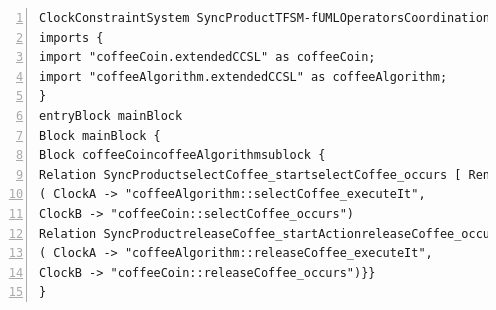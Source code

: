 \begin{lstlisting}[language=moccml,
caption={Resulting \ccsl specification for the running example},
label={lst:runningexampleccsl}, 
basicstyle=\scriptsize\ttfamily, backgroundcolor=\color{LGrey}, numbers=left, xleftmargin=2pt]
ClockConstraintSystem SyncProductTFSM-fUMLOperatorsCoordination {
imports {
import "coffeeCoin.extendedCCSL" as coffeeCoin;
import "coffeeAlgorithm.extendedCCSL" as coffeeAlgorithm;
}
entryBlock mainBlock
Block mainBlock {
Block coffeeCoincoffeeAlgorithmsublock {
Relation SyncProductselectCoffee_startselectCoffee_occurs [ RendezVous ]
( ClockA -> "coffeeAlgorithm::selectCoffee_executeIt",
ClockB -> "coffeeCoin::selectCoffee_occurs")
Relation SyncProductreleaseCoffee_startActionreleaseCoffee_occurs [ RendezVous ]
( ClockA -> "coffeeAlgorithm::releaseCoffee_executeIt",
ClockB -> "coffeeCoin::releaseCoffee_occurs")}}
}
\end{lstlisting}    